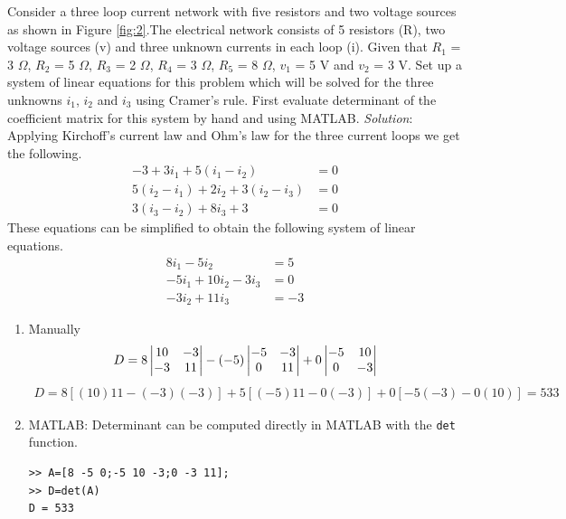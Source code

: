 \documentclass[book.tex]{subfiles}
\begin{document}
\begin{example}
Consider a three loop current network with five resistors and two voltage sources as shown in Figure \ref{fig:2}.The electrical network consists of 5 resistors (R), two voltage sources (v) and three unknown currents in each loop (i). Given that $R_1$ = 3 $\Omega$, $R_2$ = 5 $\Omega$, $R_3$ = 2 $\Omega$, $R_4$ = 3 $\Omega$, $R_5$ = 8 $\Omega$, $v_1$ = 5 V and $v_2$ = 3 V. Set up a system of linear equations for this problem which will be solved for the three unknowns $i_1$, $i_2$ and $i_3$ using Cramer's rule. First evaluate determinant of the coefficient matrix for this system by hand and using MATLAB.
\textit{Solution}: Applying Kirchoff's current law and Ohm's law for the three current loops we get the following.
\begin{align}
-3 + 3i_1 + 5(i_1 - i_2) &= 0\\
5(i_2 - i_1) + 2i_2 + 3(i_2 - i_3)&= 0\\
3(i_3 - i_2) + 8i_3 + 3 &= 0
\end{align}
These equations can be simplified to obtain the following system of linear equations.
\begin{align}
8i_1 - 5i_2  &= 5\\
-5i_1  + 10i_2 - 3i_3 &= 0\\
-3i_2 + 11i_3 &= -3
\end{align}
\begin{enumerate}
\item Manually
\[
D = 8
\begin{vmatrix}
10 & -3 \\ 
 -3 & 11  
\end{vmatrix}
- (-5)
\begin{vmatrix}
-5 & -3 \\ 
0 & 11 
\end{vmatrix} 
+ 0
\begin{vmatrix}
-5 & 10 \\ 
0 & -3 
\end{vmatrix} 
\vspace{-2pt}
\]
\begin{align}
D = 8[(10)11 - (-3)(-3)]+5[(-5)11 - 0(-3)]+0[-5(-3) - 0(10)] = 533
\end{align}
\item MATLAB: Determinant can be computed directly in MATLAB with the \verb|det| function.
\begin{Verbatim}
>> A=[8 -5 0;-5 10 -3;0 -3 11];
>> D=det(A)
D = 533
\end{Verbatim}
\end{enumerate}

\end{example}
\end{document}
